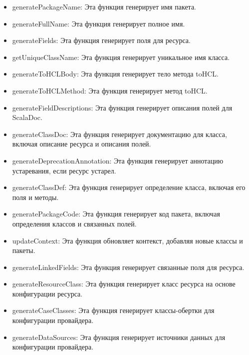 \begin{itemize}
  \item generatePackageName: Эта функция генерирует имя пакета.
  
  \item generateFullName: Эта функция генерирует полное имя.
  
  \item generateFields: Эта функция генерирует поля для ресурса.
  
  \item getUniqueClassName: Эта функция генерирует уникальное имя класса.
  
  \item generateToHCLBody: Эта функция генерирует тело метода toHCL.
  
  \item generateToHCLMethod: Эта функция генерирует метод toHCL.
  
  \item generateFieldDescriptions: Эта функция генерирует описания полей для
ScalaDoc.
  
  \item generateClassDoc: Эта функция генерирует документацию для класса,
включая описание ресурса и описания полей.
  
  \item generateDeprecationAnnotation: Эта функция генерирует аннотацию
устаревания, если ресурс устарел.
  
  \item generateClassDef: Эта функция генерирует определение класса, включая его
поля и методы.
  
  \item generatePackageCode: Эта функция генерирует код пакета, включая
определения классов и связанных полей.
  
  \item updateContext: Эта функция обновляет контекст, добавляя новые классы и
пакеты.
  
  \item generateLinkedFields: Эта функция генерирует связанные поля для ресурса.
  
  \item generateResourceClass: Эта функция генерирует класс ресурса на основе
конфигурации ресурса.
  
  \item generateCaseClasses: Эта функция генерирует классы-обертки для
конфигурации провайдера.
  
  \item generateDataSources: Эта функция генерирует источники данных для
конфигурации провайдера.
  

\end{itemize}
